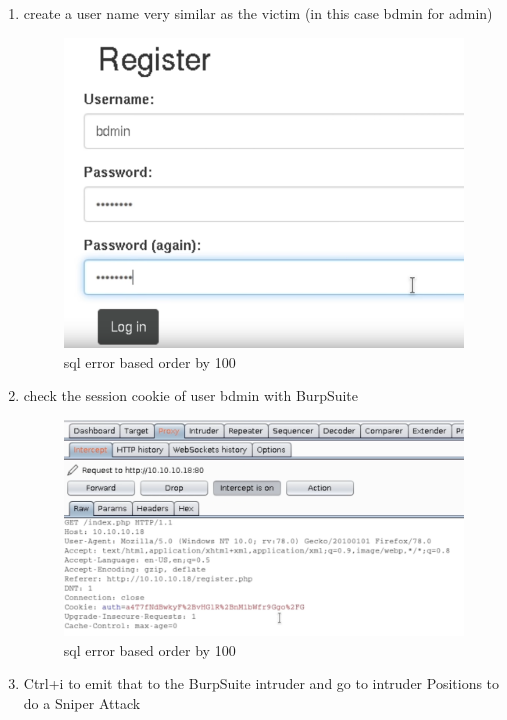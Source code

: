\documentclass{assets/ipesethesis}
\begin{document}
\begin{enumerate}
\def\labelenumi{\arabic{enumi}.}
\item
  create a user name very similar as the victim (in this case bdmin for admin)

  \begin{figure}
   \includegraphics[width=0.9\linewidth]{images/bit-flip-registration} \caption{sql error based order by 100}\label{fig:unnamed-chunk-9}
   \end{figure}
\item
  check the session cookie of user bdmin with BurpSuite

  \begin{figure}
   \includegraphics[width=0.9\linewidth]{images/bit-flip-checkcookie} \caption{sql error based order by 100}\label{fig:unnamed-chunk-10}
   \end{figure}
\item
  Ctrl+i to emit that to the BurpSuite intruder and go to intruder Positions to do a Sniper Attack


\end{enumerate}
\end{document}
